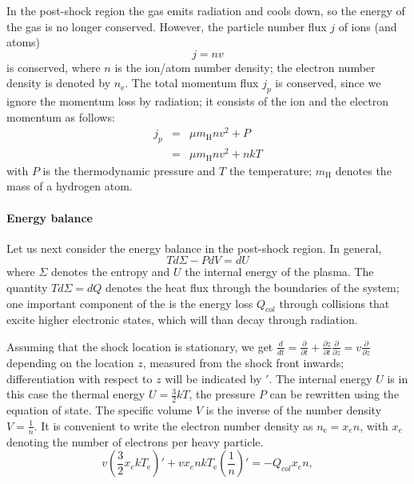 In the post-shock region the gas emits radiation and cools down, so the energy of the gas is no longer conserved.  However, the particle number flux $j$ of ions (and atoms)
\begin{equation}j=nv\label{j_n}\end{equation}
is conserved, where $n$ is the ion/atom number density; the electron number density is denoted by $n_{\mathrm{e}}$. The total momentum flux $j_p$ is conserved, since we ignore the momentum loss by radiation; it consists of the ion and the electron momentum as follows:
\begin{eqnarray}
j_p&=&\mu m_{\mathrm{H}} n v^2+P \nonumber \\
   &=&\mu m_{\mathrm{H}} n v^2+nkT \label{j_p}
\end{eqnarray}
with $P$ is the thermodynamic pressure and $T$ the temperature; $m_{\mathrm{H}}$ denotes the mass of a hydrogen atom.

\paragraph{Energy balance}
\label{sect:energybalance}

Let us next consider the energy balance in the post-shock region. In general,
\begin{equation} \label{tsminuspdvisdu} T d\Sigma -P dV=dU \end{equation}
where $\Sigma$ denotes the entropy and $U$ the internal energy of the plasma. The quantity $T d\Sigma=dQ$ denotes the heat flux through the boundaries of the system; one important component of the is the energy loss $Q_{col}$ through collisions that excite higher electronic states, which will than decay through radiation.

Assuming that the shock location is stationary, we get $\frac{d}{dt}=\frac{\partial}{\partial t}+\frac{\partial z}{\partial t}\frac{\partial}{\partial z}=v\frac{\partial}{\partial z}$ depending on the location $z$, measured from the shock front inwards; differentiation with respect to $z$ will be indicated by $'$.
The internal energy $U$ is in this case the thermal energy $U=\frac{3}{2}kT$, the pressure $P$ can be rewritten using the equation of state. The specific volume $V$ is the inverse of the number density $V=\frac{1}{n}$.
It is convenient to write the electron number density as \mbox{$n_{\mathrm{e}}=x_e n$,} with $x_e$ denoting the number of electrons per heavy particle.
\begin{equation}
\label{energyelec}
v\left(\frac{3}{2}x_e k T_{\mathrm{e}}\right)'+v x_e n k T_{\mathrm{e}} \left(\frac{1}{n}\right)'=-Q_{col} x_e n,
\end{equation}

